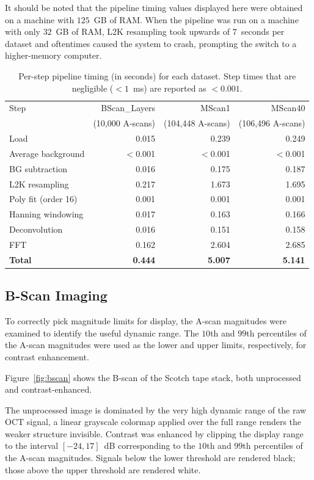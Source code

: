 \documentclass[10pt]{article}
\begin{document}
It should be noted that the pipeline timing values displayed here were obtained on a machine with $125$~GB of RAM. When the pipeline was run on a machine with only $32$~GB of RAM, L2K resampling took upwards of $7$~seconds per dataset and oftentimes caused the system to crash, prompting the switch to a higher-memory computer.
 
\begin{table}[ht]
  \centering
  \caption{Per-step pipeline timing (in seconds) for each dataset. Step times that are negligible ($<1$~ms) are reported as $<0.001$.}
  \label{tab:timing}
  \small
  \begin{tabular}{lrrr}
    \hline
    Step & BScan\_Layers & MScan1 & MScan40 \\
     & (10{,}000 A-scans) & (104{,}448 A-scans) & (106{,}496 A-scans) \\
    \hline
    Load              & 0.015 & 0.239 & 0.249 \\
    Average background & $<$0.001 & $<$0.001 & $<$0.001 \\
    BG subtraction    & 0.016 & 0.175 & 0.187 \\
    L2K resampling    & 0.217 & 1.673 & 1.695 \\
    Poly fit (order 16) & 0.001 & 0.001 & 0.001 \\
    Hanning windowing & 0.017 & 0.163 & 0.166 \\
    Deconvolution     & 0.016 & 0.151 & 0.158 \\
    FFT               & 0.162 & 2.604 & 2.685 \\
    \hline
    \textbf{Total}    & \textbf{0.444} & \textbf{5.007} & \textbf{5.141} \\
    \hline
  \end{tabular}
\end{table}

\subsection{B-Scan Imaging}

To correctly pick magnitude limits for display, the A-scan magnitudes were examined to identify the useful dynamic range. The $10$th and $99$th percentiles of the A-scan magnitudes were used as the lower and upper limits, respectively, for contrast enhancement.

Figure~\ref{fig:bscan} shows the B-scan of the Scotch tape stack, both unprocessed and contrast-enhanced.

The unprocessed image is dominated by the very high dynamic range of the raw OCT signal, a linear grayscale colormap applied over the full range renders the weaker structure invisible. Contrast was enhanced by clipping the display range to the interval $[-24, 17]$~dB corresponding to the $10$th and $99$th percentiles of the A-scan magnitudes. Signals below the lower threshold are rendered black; those above the upper threshold are rendered white. 
\end{document}
